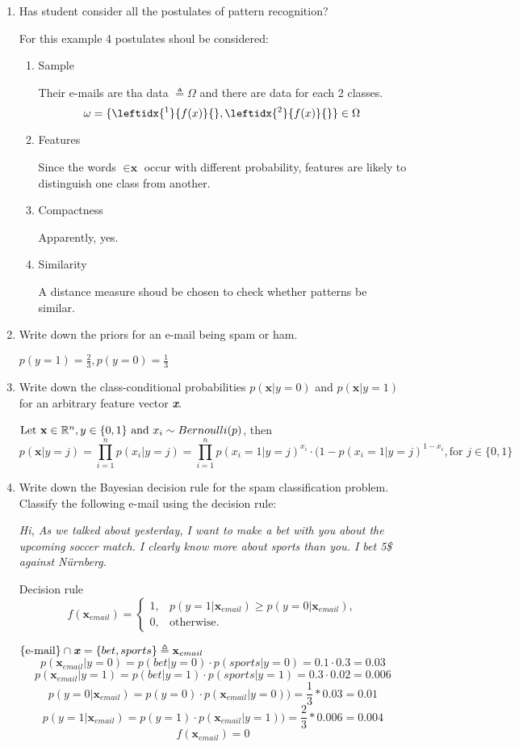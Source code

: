 \documentclass{homework}
\begin{document}
\begin{enumerate}[label=(\alph*)]
\item Has student consider all the postulates of pattern recognition?

	For this example 4 postulates shoul be considered:
	\begin{enumerate}[label=\arabic*]
	\item Sample

	Their e-mails are tha data $\triangleq \Omega$ and there are data for each 2 classes.
	\[\omega = \{\leftidx{^1}{f(x)}{}, \leftidx{^2}{f(x)}{}\} \in \Omega \]
	\item Features

	Since the words $\in \textbf{x}$ occur with different probability, features are likely to distinguish one class from another.
	\item Compactness

	Apparently, yes.
	\item Similarity
	
	A distance measure shoud be chosen to check whether patterns be similar. 
	\end{enumerate}
\item Write down the priors for an e-mail being spam or ham.

$p(y=1) = \frac{2}{3}, p(y=0) = \frac{1}{3}$
\item Write down the class-conditional probabilities $p(\textbf{x}|y=0)$ and $p(\textbf{x}|y=1)$ for an arbitrary feature vector \textbf{\emph{x}}.

 $\text{Let } \textbf{x} \in \mathbb R^n, y \in \{0, 1\} \text{ and } x_i \sim Bernoulli(p)$, then
\[p(\textbf{x}|y = j) = \prod_{i=1}^n p(x_i|y=j) = \prod_{i=1}^n p(x_i = 1|y=j)^{x_i}\cdot (1-p(x_i = 1|y=j)^{1 - x_i}, \text{for } j \in \{0, 1\}\]

\item Write down the Bayesian decision rule for the spam classification problem. Classify the following e-mail using the decision rule:

\emph{Hi, As we talked about yesterday, I want to make a bet with you about the upcoming soccer match. I clearly know more about sports than you. I bet 5\$ against N{\"u}rnberg.}

Decision rule
\begin{equation*}
	f(\textbf{x}_{email})=
	\begin{cases} 
		1, &  p(y = 1|\textbf{x}_{email})\geq p(y = 0|\textbf{x}_{email}), \\ 
		0, & \text{otherwise}.
	\end{cases}
\end{equation*}

$\{\text{e-mail}\} \cap \textbf{\emph{x}} = \{bet, sports\} \triangleq \textbf{x}_{email}$
\[p(\textbf{x}_{email}|y=0) = p(bet|y = 0) \cdot p(sports|y = 0) = 0.1 \cdot 0.3 = 0.03\]
\[p(\textbf{x}_{email}|y=1) = p(bet|y = 1) \cdot p(sports|y = 1) = 0.3 \cdot 0.02 = 0.006\]
\[p(y = 0|\textbf{x}_{email}) =p(y=0) \cdot p(\textbf{x}_{email}|y=0)) = \frac{1}{3} * 0.03 = 0.01\]
\[p(y = 1|\textbf{x}_{email}) =p(y=1) \cdot p(\textbf{x}_{email}|y=1)) = \frac{2}{3} * 0.006 = 0.004\]
\[f(\textbf{x}_{email}) = 0\]
	
\end{enumerate}
\end{document}
